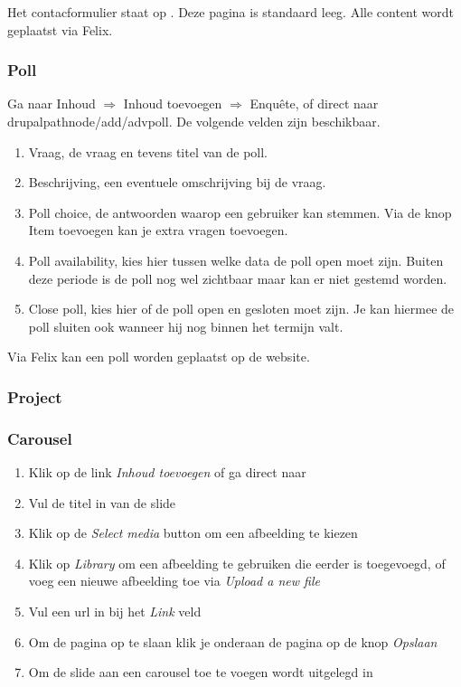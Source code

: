 Het contacformulier staat op . Deze pagina is standaard leeg. Alle content wordt geplaatst via Felix.


\subsubsection{Poll}
Ga naar Inhoud $\Rightarrow$ Inhoud toevoegen $\Rightarrow$ Enqu\^{e}te, of direct naar drupalpath{node/add/advpoll}. De volgende velden zijn beschikbaar.
\begin{enumerate}
\item Vraag, de vraag en tevens titel van de poll.
\item Beschrijving, een eventuele omschrijving bij de vraag.
\item Poll choice, de antwoorden waarop een gebruiker kan stemmen. Via de knop Item toevoegen kan je extra vragen toevoegen.
\item Poll availability, kies hier tussen welke data de poll open moet zijn. Buiten deze periode is de poll nog wel zichtbaar maar kan er niet gestemd worden.
\item Close poll, kies hier of de poll open en gesloten moet zijn. Je kan hiermee de poll sluiten ook wanneer hij nog binnen het termijn valt.
\end{enumerate}

Via Felix kan een poll worden geplaatst op de website.


\subsubsection{Project}\label{projectnode}


\subsubsection{Carousel}
\begin{enumerate}
\item Klik op de link \emph{Inhoud toevoegen} of ga direct naar \
\item Vul de titel in van de slide
\item Klik op de \emph{Select media} button om een afbeelding te kiezen
\item Klik op \emph{Library} om een afbeelding te gebruiken die eerder is toegevoegd,  of voeg een nieuwe afbeelding toe via \emph{Upload a new file}
\item Vul een url in bij het \emph{Link} veld
\item Om de pagina op te slaan klik je onderaan de pagina op de knop \emph{Opslaan}
\item Om de slide aan een carousel toe te voegen wordt uitgelegd in 
\end{enumerate}

